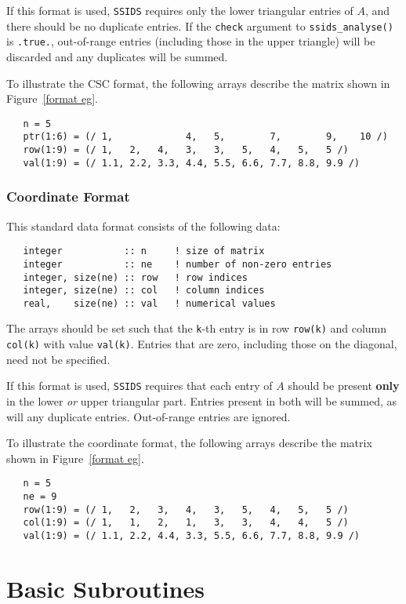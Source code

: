 If this format is used, \texttt{SSIDS} requires only the lower triangular entries of $A$, and there 
should be no duplicate entries. If the \texttt{check}
argument to
\texttt{ssids\_analyse()} is \texttt{.true.}, out-of-range entries (including
those in the upper triangle) will be discarded and any duplicates will be
summed.

To illustrate the CSC format, the following arrays describe the matrix shown in
Figure~\ref{format eg}.
\begin{verbatim}
   n = 5
   ptr(1:6) = (/ 1,             4,   5,        7,        9,    10 /)
   row(1:9) = (/ 1,   2,   4,   3,   3,   5,   4,   5,   5 /)
   val(1:9) = (/ 1.1, 2.2, 3.3, 4.4, 5.5, 6.6, 7.7, 8.8, 9.9 /)
\end{verbatim}

\subsubsection{Coordinate Format} \label{coordformat}
This standard data format consists of the following data:
\begin{verbatim}
   integer           :: n     ! size of matrix
   integer           :: ne    ! number of non-zero entries
   integer, size(ne) :: row   ! row indices
   integer, size(ne) :: col   ! column indices
   real,    size(ne) :: val   ! numerical values
\end{verbatim}
The arrays should be set such that the \texttt{k}-th entry is in row
\texttt{row(k)} and column \texttt{col(k)} with value \texttt{val(k)}.
Entries that are zero, including those on the diagonal, need not be specified.

If this format is used,
\texttt{SSIDS} requires that each entry of $A$ should be present \textbf{only} in the
lower \textit{or} upper triangular part. Entries present in both will be summed, as
will any duplicate entries. Out-of-range entries are ignored.

To illustrate the coordinate format, the following arrays describe the matrix shown in
Figure~\ref{format eg}.
\begin{verbatim}
   n = 5
   ne = 9
   row(1:9) = (/ 1,   2,   3,   4,   3,   5,   4,   5,   5 /)
   col(1:9) = (/ 1,   1,   2,   1,   3,   3,   4,   4,   5 /)
   val(1:9) = (/ 1.1, 2.2, 4.4, 3.3, 5.5, 6.6, 7.7, 8.8, 9.9 /)
\end{verbatim}


\section{Basic Subroutines}

